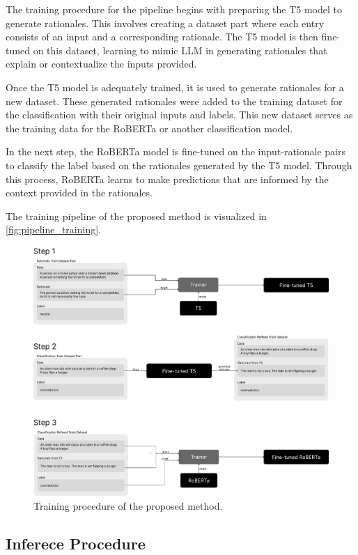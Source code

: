The training procedure for the pipeline begins with preparing the T5 model to generate rationales. This involves creating a dataset part where each entry consists of an input and a corresponding rationale. The T5 model is then fine-tuned on this dataset, learning to mimic LLM in generating rationales that explain or contextualize the inputs provided.

Once the T5 model is adequately trained, it is used to generate rationales for a new dataset. These generated rationales were added to the training dataset for the classification with their original inputs and labels. This new dataset serves as the training data for the RoBERTa or another classification model.

In the next step, the RoBERTa model is fine-tuned on the input-rationale pairs to classify the label based on the rationales generated by the T5 model. Through this process, RoBERTa learns to make predictions that are informed by the context provided in the rationales.

The training pipeline of the proposed method is visualized in \autoref{fig:pipeline_training}.

\begin{figure}[hbt]
    \centering
    \includegraphics[width=\linewidth]{figs/pipeline_training.pdf}
    \caption{Training procedure of the proposed method.}
    \label{fig:pipeline_training}
\end{figure}

\subsection*{Inferece Procedure}


